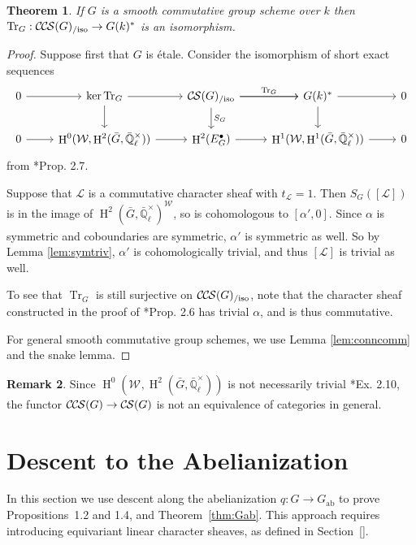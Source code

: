 \documentclass[10pt]{amsart}
\theoremstyle{plain}
\newtheorem{theorem}{Theorem}[section]
\theoremstyle{definition}
\newtheorem{remark}[theorem]{Remark}
\newcommand{\EE}{\mathbb{\bar Q}_\ell}
\newcommand{\Fq}{k}
\newcommand{\EEx}{\EE^\times}
\newcommand{\Weil}[1]{\mathcal{W}_{#1}}
\DeclareMathOperator{\Hh}{H}
\newcommand{\ab}{_{\operatorname{ab}}}
\newcommand{\trFrob}[1]{t_{#1}}
\newcommand{\TrFrob}[1]{\operatorname{Tr}_{#1}}
\newcommand{\cs}[1]{{\mathcal{#1}}}
\newcommand{\CS}{{\mathcal{C\hskip-0.8pt S}}}
\newcommand{\CCS}{{\mathcal{C\hskip-.8pt C\hskip-0.8pt S}}}
\newcommand{\CSiso}[1]{\CS(#1)_{/\text{iso}}}
\newcommand{\CCSiso}[1]{\CCS(#1)_{/\text{iso}}}
\newcommand{\bG}{\bar{G}}
\begin{document}
\begin{theorem} \label{thm:trfrobiso}
If $G$ is a smooth commutative group scheme over $\Fq$ then $\TrFrob{G} : \CCSiso{G} \to G(\Fq)^*$ is an isomorphism.
\end{theorem}

\begin{proof}
Suppose first that $G$ is \'etale.  Consider the isomorphism of short exact sequences
\[
\begin{tikzcd}
 0 \arrow{r} & \ker \TrFrob{G} \arrow{d} \arrow{r} & \CSiso{G}\arrow{d}{S_G} \arrow{r}{\TrFrob{G}} \arrow{r} & G(\Fq)^* \arrow{d} \arrow{r} & 0\\
  0 \arrow{r} & \Hh^0(\Weil{},\Hh^2(\bG,\EEx)) \arrow{r} & \Hh^2(E^\bullet_G) \arrow{r} & \Hh^1(\Weil{},\Hh^1(\bG,\EEx)) \arrow{r} & 0
 \end{tikzcd}
 \]
from \cite{cunningham-roe:13a}*{Prop. 2.7}.

Suppose that $\cs{L}$ is a commutative character sheaf
with $\trFrob{\cs{L}} = 1$.  Then $S_G([\cs{L}])$ is in the image of $\Hh^2(\bG, \EEx)^\Weil{}$, so is cohomologous to
$[\alpha', 0]$.  Since $\alpha$ is symmetric and coboundaries are symmetric, $\alpha'$ is symmetric as well.
So by Lemma \ref{lem:symtriv}, $\alpha'$ is cohomologically trivial, and thus $[\cs{L}]$ is trivial as well.

To see that $\TrFrob{G}$ is still surjective on $\CCSiso{G}$, note that the character sheaf constructed in the proof of
\cite{cunningham-roe:13a}*{Prop. 2.6} has trivial $\alpha$, and is thus commutative.

For general smooth commutative group schemes, we use Lemma \ref{lem:conncomm} and the snake lemma.
\end{proof}

\begin{remark}
Since $\Hh^0(\Weil{},\Hh^2(\bG,\EEx))$ is not necessarily trivial \cite{cunningham-roe:13a}*{Ex. 2.10}, the functor
$\CCS(G) \to \CS(G)$ is not an equivalence of categories in general.
\end{remark}


\section{Descent to the Abelianization} \label{sec:descent}

In this section we use descent along the abelianization $q : G \to G\ab$ to prove Propositions~1.2 and 1.4, and Theorem~\ref{thm:Gab}.
This approach requires introducing equivariant linear character sheaves, as defined in Section~[].
\end{document}
